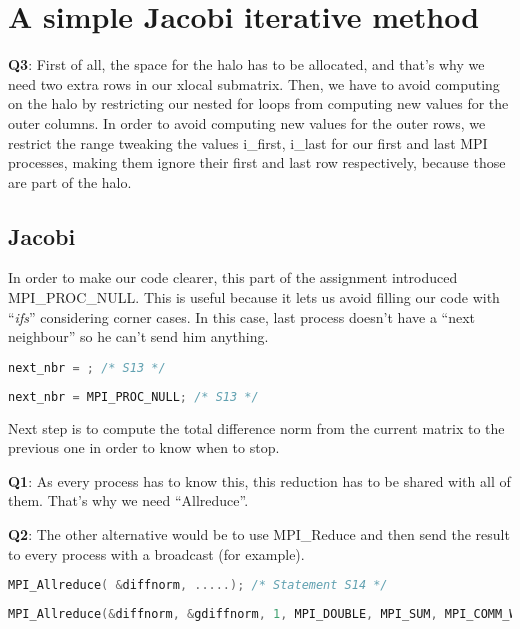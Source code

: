 \documentclass[a4paper, 10pt]{article}
\begin{document}
\section{A simple Jacobi iterative method}

\textbf{Q3}: First of all, the space for the halo has to be allocated, and that's why we need two extra rows in our xlocal submatrix. Then, we have to avoid computing on the halo by restricting our nested for loops from computing new values for the outer columns. In order to avoid computing new values for the outer rows, we restrict the range tweaking the values i\_first, i\_{last} for our first and last MPI processes, making them ignore their first and last row respectively, because those are part of the halo. 

\subsection{Jacobi}
    In order to make our code clearer, this part of the assignment introduced MPI\_PROC\_NULL. This is useful because it lets us avoid filling our code with ``\textit{ifs}'' considering corner cases. In this case, last process doesn't have a ``next neighbour'' so he can't send him anything. 
    \begin{lstlisting}[language=c, caption={Template S13}]
next_nbr = ; /* S13 */
    \end{lstlisting}

    \begin{lstlisting}[language=c, caption={Correct S13}]
next_nbr = MPI_PROC_NULL; /* S13 */
    \end{lstlisting}


Next step is to compute the total difference norm from the current matrix to the previous one in order to know when to stop. 

\textbf{Q1}: As every process has to know this, this reduction has to be shared with all of them. That's why we need ``Allreduce''. 

\textbf{Q2}: The other alternative would be to use MPI\_Reduce and then send the result to every process with a broadcast (for example).
    \begin{lstlisting}[language=c, caption={Template S14}]
MPI_Allreduce( &diffnorm, .....); /* Statement S14 */
    \end{lstlisting}

    \begin{lstlisting}[language=c, caption={Correct S14}]
MPI_Allreduce(&diffnorm, &gdiffnorm, 1, MPI_DOUBLE, MPI_SUM, MPI_COMM_WORLD); /* S14 */
    \end{lstlisting}
\end{document}
